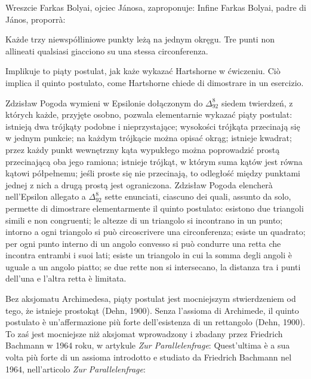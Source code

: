 Wreszcie Farkas Bolyai, ojciec Jánosa, zaproponuje: %
Infine Farkas Bolyai, padre di János, proporrà: %

\begin{proposition}
[aksjomat Bolyaia] %
[assioma di Bolyai] %
	Każde trzy niewspółliniowe punkty leżą na jednym okręgu. %
	Tre punti non allineati qualsiasi giacciono su una stessa circonferenza. %
\end{proposition}

Implikuje to piąty postulat, jak każe wykazać Hartshorne w ćwiczeniu. %
Ciò implica il quinto postulato, come Hartshorne chiede di dimostrare in un esercizio. %

Zdzisław Pogoda wymieni w Epsilonie dołączonym do $\Delta_{92}^{8}$ siedem twierdzeń, z których każde, przyjęte osobno, pozwala elementarnie wykazać piąty postulat: istnieją dwa trójkąty podobne i nieprzystające; wysokości trójkąta przecinają się w jednym punkcie; na każdym trójkącie można opisać okrąg; istnieje kwadrat; przez każdy punkt wewnętrzny kąta wypukłego można poprowadzić prostą przecinającą oba jego ramiona; istnieje trójkąt, w którym suma kątów jest równa kątowi półpełnemu; jeśli proste się nie przecinają, to odległość między punktami jednej z nich a drugą prostą jest ograniczona. %
Zdzisław Pogoda elencherà nell'Epsilon allegato a $\Delta_{92}^{8}$ sette enunciati, ciascuno dei quali, assunto da solo, permette di dimostrare elementarmente il quinto postulato: esistono due triangoli simili e non congruenti; le altezze di un triangolo si incontrano in un punto; intorno a ogni triangolo si può circoscrivere una circonferenza; esiste un quadrato; per ogni punto interno di un angolo convesso si può condurre una retta che incontra entrambi i suoi lati; esiste un triangolo in cui la somma degli angoli è uguale a un angolo piatto; se due rette non si intersecano, la distanza tra i punti dell'una e l'altra retta è limitata. %


Bez aksjomatu Archimedesa, piąty postulat jest mocniejszym stwierdzeniem od tego, że istnieje prostokąt (Dehn, 1900). %
Senza l'assioma di Archimede, il quinto postulato è un'affermazione più forte dell'esistenza di un rettangolo (Dehn, 1900). %
To zaś jest mocniejsze niż aksjomat wprowadzony i zbadany przez Friedrich Bachmann w 1964 roku, w artykule \emph{Zur Parallelenfrage}: %
Quest'ultima è a sua volta più forte di un assioma introdotto e studiato da Friedrich Bachmann nel 1964, nell'articolo \emph{Zur Parallelenfrage}: %
%

